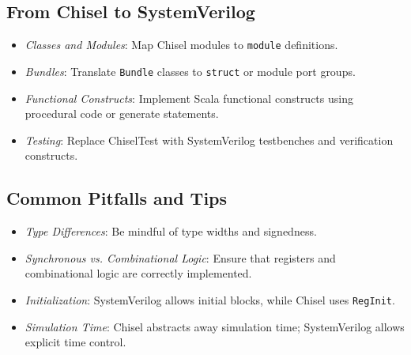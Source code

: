 \subsection{From Chisel to SystemVerilog}

\begin{itemize}
    \item \textit{Classes and Modules}: Map Chisel modules to \texttt{module} definitions.
    \item \textit{Bundles}: Translate \texttt{Bundle} classes to \texttt{struct} or module port groups.
    \item \textit{Functional Constructs}: Implement Scala functional constructs using procedural code or generate statements.
    \item \textit{Testing}: Replace ChiselTest with SystemVerilog testbenches and verification constructs.
\end{itemize}

\subsection{Common Pitfalls and Tips}

\begin{itemize}
    \item \textit{Type Differences}: Be mindful of type widths and signedness.
    \item \textit{Synchronous vs. Combinational Logic}: Ensure that registers and combinational logic are correctly implemented.
    \item \textit{Initialization}: SystemVerilog allows initial blocks, while Chisel uses \texttt{RegInit}.
    \item \textit{Simulation Time}: Chisel abstracts away simulation time; SystemVerilog allows explicit time control.
\end{itemize}




